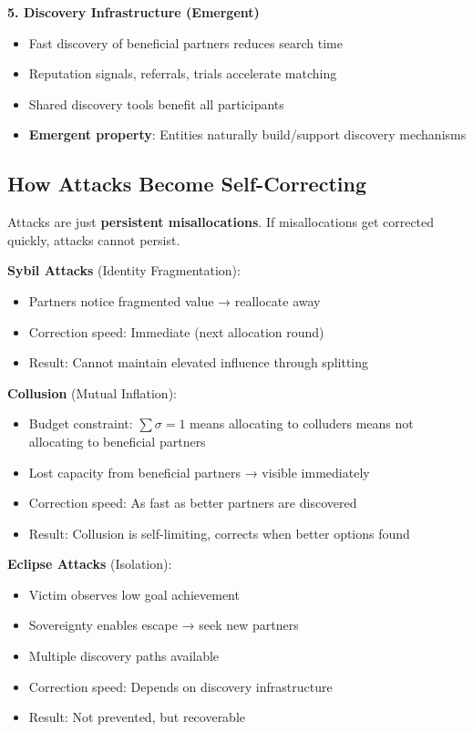 \documentclass[11pt,a4paper]{article}
\theoremstyle{definition}
\theoremstyle{remark}
\begin{document}
\textbf{5. Discovery Infrastructure (Emergent)}
\begin{itemize}
\item Fast discovery of beneficial partners reduces search time
\item Reputation signals, referrals, trials accelerate matching
\item Shared discovery tools benefit all participants
\item \textbf{Emergent property}: Entities naturally build/support discovery mechanisms
\end{itemize}

\subsection{How Attacks Become Self-Correcting}

Attacks are just \textbf{persistent misallocations}. If misallocations get corrected quickly, attacks cannot persist.

\textbf{Sybil Attacks} (Identity Fragmentation):
\begin{itemize}
\item Partners notice fragmented value → reallocate away
\item Correction speed: Immediate (next allocation round)
\item Result: Cannot maintain elevated influence through splitting
\end{itemize}

\textbf{Collusion} (Mutual Inflation):
\begin{itemize}
\item Budget constraint: $\sum \sigma = 1$ means allocating to colluders means not allocating to beneficial partners
\item Lost capacity from beneficial partners → visible immediately
\item Correction speed: As fast as better partners are discovered
\item Result: Collusion is self-limiting, corrects when better options found
\end{itemize}

\textbf{Eclipse Attacks} (Isolation):
\begin{itemize}
\item Victim observes low goal achievement
\item Sovereignty enables escape → seek new partners
\item Multiple discovery paths available
\item Correction speed: Depends on discovery infrastructure
\item Result: Not prevented, but recoverable
\end{itemize}
\end{document}
